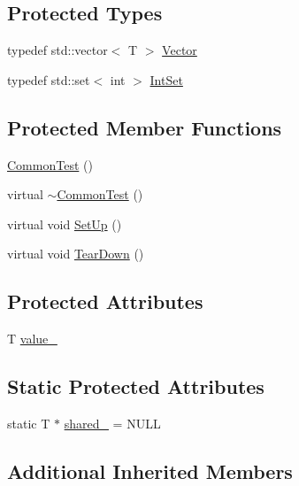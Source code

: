 \subsection*{Protected Types}
\begin{DoxyCompactItemize}
\item 
typedef std\+::vector$<$ T $>$ \hyperlink{class_common_test_a6dfdcede6964887b9f4254a0e0478e37}{Vector}
\item 
typedef std\+::set$<$ int $>$ \hyperlink{class_common_test_a62827e9d3064cddf4a8698747f1bd434}{Int\+Set}
\end{DoxyCompactItemize}
\subsection*{Protected Member Functions}
\begin{DoxyCompactItemize}
\item 
\hyperlink{class_common_test_abd5ec205d90f4b81efab2a6f972f3db0}{Common\+Test} ()
\item 
virtual \hyperlink{class_common_test_a675a632fcf7b1fd961fefc619d6a458d}{$\sim$\+Common\+Test} ()
\item 
virtual void \hyperlink{class_common_test_a4c7bf7889ce48a9d06530bc4a437f3f5}{Set\+Up} ()
\item 
virtual void \hyperlink{class_common_test_aeae195c2cefa956c6ae5be1226e6ecd8}{Tear\+Down} ()
\end{DoxyCompactItemize}
\subsection*{Protected Attributes}
\begin{DoxyCompactItemize}
\item 
T \hyperlink{class_common_test_ae59c4abcb833625a7baeb2048531ebec}{value\+\_\+}
\end{DoxyCompactItemize}
\subsection*{Static Protected Attributes}
\begin{DoxyCompactItemize}
\item 
static T $\ast$ \hyperlink{class_common_test_a52368ce1e65a865db9bdccbcc2cedaac}{shared\+\_\+} = N\+U\+LL
\end{DoxyCompactItemize}
\subsection*{Additional Inherited Members}


